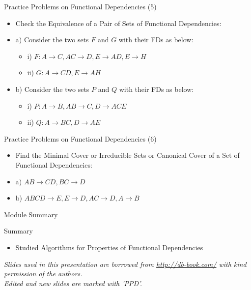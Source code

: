 \documentclass[aspectratio=169, xcolor=dvipsnames]{beamer}
\begin{document}
\begin{frame}{Practice Problems on Functional Dependencies (5)}
    \begin{itemize}[<+->]
        \item Check the Equivalence of a Pair of Sets of Functional Dependencies:
        \item a) Consider the two sets $F$ and $G$ with their FDs as below:
        \begin{itemize}
            \item[$\triangleright$] i) $F: A \rightarrow C, AC \rightarrow D, E \rightarrow AD, E \rightarrow H$
            \item[$\triangleright$] ii) $G: A \rightarrow CD, E \rightarrow AH$
        \end{itemize}
        \item b) Consider the two sets $P$ and $Q$ with their FDs as below:
        \begin{itemize}
            \item[$\triangleright$] i) $P: A \rightarrow B, AB \rightarrow C, D \rightarrow ACE$
            \item[$\triangleright$] ii) $Q: A \rightarrow BC, D \rightarrow AE$
        \end{itemize}
    \end{itemize}
\end{frame}

\begin{frame}{Practice Problems on Functional Dependencies (6)}
    \begin{itemize}[<+->]
        \item Find the Minimal Cover or Irreducible Sets or Canonical Cover of a Set of Functional Dependencies:
        \item a) $AB \rightarrow CD, BC \rightarrow D$
        \item b) $ABCD \rightarrow E, E \rightarrow D, AC \rightarrow D, A \rightarrow B$
    \end{itemize}
\end{frame}

\begin{frame}{Module Summary}
    \begin{block}{Summary}
        \begin{itemize}[<+->]
            \item Studied Algorithms for Properties of Functional Dependencies
        \end{itemize}
    \end{block}
    \vspace{2em}
    \begin{center}
    \small \textit{Slides used in this presentation are borrowed from \url{http://db-book.com/} with kind permission of the authors.} \\
    \small \textit{Edited and new slides are marked with 'PPD'.}
    \end{center}
\end{frame}
\end{document}
